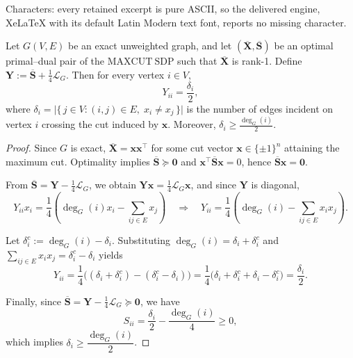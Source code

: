 \documentclass[10pt,a4paper]{amsart}
\newcommand{\X}{\mathbf{X}}
\newcommand{\Y}{\mathbf{Y}}
\newcommand{\bS}{\mathbf{S}}
\newcommand{\bz}{\mathbf{0}}
\newcommand{\x}{\mathbf{x}}
\renewcommand{\L}{\mathcal{L}}
\begin{document}
Characters: every retained excerpt is pure ASCII, so the delivered engine, XeLaTeX with its default Latin Modern text font, reports no missing character.
\begin{lemma}\label{lem:2}
Let $G(V,E)$ be an exact unweighted graph, and let $(\overline{\X}, \overline{\bS})$ be an optimal primal--dual pair of the $\mathrm{MAXCUT\ SDP}$ such that $\overline{\X}$ is rank-1. 
Define $\Y := \overline{\bS} + \tfrac{1}{4}\L_G$. 
Then for every vertex $i \in V$,
\[
Y_{ii} = \frac{\delta_i}{2},
\]
where $\delta_i = \bigl|\{\, j \in V : (i,j) \in E,\; x_i \neq x_j \,\}\bigr|$ 
is the number of edges incident on vertex $i$ crossing the cut induced by $\x$. 
Moreover, $\delta_i \ge \tfrac{\deg_G(i)}{2}$.
\end{lemma}

\begin{proof}
Since $G$ is exact, $\overline{\X} = \x\x^{\top}$ for some cut vector $\x \in \{\pm 1\}^n$ attaining the maximum cut. 
Optimality implies $\overline{\bS} \succeq \bz$ and $\x^{\top}\overline{\bS}\x = 0$, hence $\overline{\bS}\x = \mathbf{0}$. 

From $\overline{\bS} = \Y - \tfrac{1}{4}\L_G$, we obtain $\Y\x = \tfrac{1}{4}\L_G\x$, and since $\Y$ is diagonal,
\[
Y_{ii}x_i = \dfrac{1}{4}\!\left(\deg_G(i) x_i - \sum_{ij \in E} x_j\right)
\quad\Rightarrow\quad
Y_{ii} = \dfrac{1}{4}\!\left(\deg_G(i) - \sum_{ij \in E} x_i x_j\right).
\]

Let $\delta_i^c := \deg_G(i) - \delta_i$. Substituting $\deg_G(i) = \delta_i + \delta_i^c$ and $\displaystyle \sum_{ij \in E} x_i x_j = \delta_i^c - \delta_i$ yields
\[
Y_{ii}
= \dfrac{1}{4}\bigl((\delta_i + \delta_i^c) - (\delta_i^c - \delta_i)\bigr)
= \dfrac{1}{4}\bigl(\delta_i + \delta_i^c + \delta_i - \delta_i^c\bigr)
= \frac{\delta_i}{2}.
\]

Finally, since $\overline{\bS} = \Y - \tfrac{1}{4}\L_G \succeq \bz$, we have
\[
S_{ii} = \frac{\delta_i}{2} - \frac{\deg_G(i)}{4} \ge 0,
\]
which implies $\delta_i \ge \dfrac{\deg_G(i)}{2}$.
\end{proof}
\end{document}
